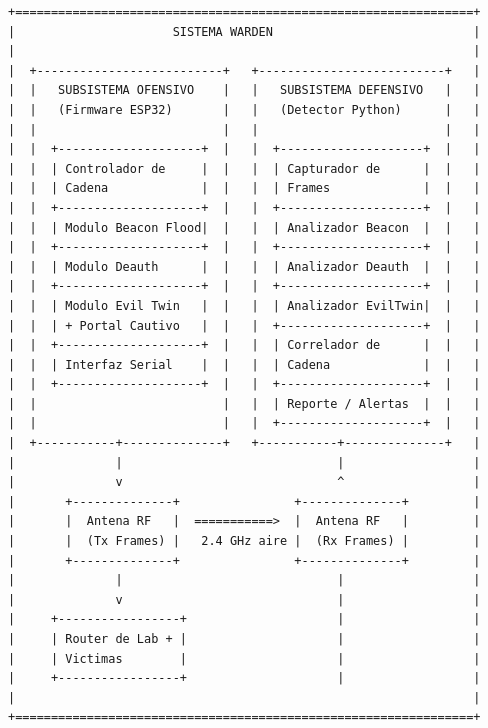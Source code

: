 \documentclass[11pt,a4paper]{article}
\begin{document}
\vspace{0.3cm}
\begin{verbatim}
+================================================================+
|                      SISTEMA WARDEN                            |
|                                                                |
|  +--------------------------+   +--------------------------+   |
|  |   SUBSISTEMA OFENSIVO    |   |   SUBSISTEMA DEFENSIVO   |   |
|  |   (Firmware ESP32)       |   |   (Detector Python)      |   |
|  |                          |   |                          |   |
|  |  +--------------------+  |   |  +--------------------+  |   |
|  |  | Controlador de     |  |   |  | Capturador de      |  |   |
|  |  | Cadena             |  |   |  | Frames             |  |   |
|  |  +--------------------+  |   |  +--------------------+  |   |
|  |  | Modulo Beacon Flood|  |   |  | Analizador Beacon  |  |   |
|  |  +--------------------+  |   |  +--------------------+  |   |
|  |  | Modulo Deauth      |  |   |  | Analizador Deauth  |  |   |
|  |  +--------------------+  |   |  +--------------------+  |   |
|  |  | Modulo Evil Twin   |  |   |  | Analizador EvilTwin|  |   |
|  |  | + Portal Cautivo   |  |   |  +--------------------+  |   |
|  |  +--------------------+  |   |  | Correlador de      |  |   |
|  |  | Interfaz Serial    |  |   |  | Cadena             |  |   |
|  |  +--------------------+  |   |  +--------------------+  |   |
|  |                          |   |  | Reporte / Alertas  |  |   |
|  |                          |   |  +--------------------+  |   |
|  +-----------+--------------+   +-----------+--------------+   |
|              |                              |                  |
|              v                              ^                  |
|       +--------------+                +--------------+         |
|       |  Antena RF   |  ===========>  |  Antena RF   |         |
|       |  (Tx Frames) |   2.4 GHz aire |  (Rx Frames) |         |
|       +--------------+                +--------------+         |
|              |                              |                  |
|              v                              |                  |
|     +-----------------+                     |                  |
|     | Router de Lab + |                     |                  |
|     | Victimas        |                     |                  |
|     +-----------------+                     |                  |
|                                                                |
+================================================================+
\end{verbatim}
\end{document}
